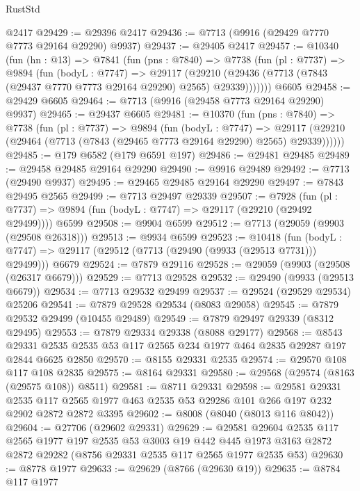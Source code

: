 \begin{lexlean}{RustStd}
\begin{coremodule}
    @2417
@29429 := @29396 @2417
@29436 := @7713 (@9916 (@29429 @7770 @7773 @29164 @29290) @9937)
@29437 := @29405 @2417
@29457 := @10340
    (fun (hn : @13) =>
    @7841
      (fun (pns : @7840) =>
      @7738
        (fun (pl : @7737) =>
        @9894
          (fun (bodyL : @7747) =>
          @29117
            (@29210 (@29436 (@7713 (@7843 (@29437 @7770 @7773 @29164 @29290) @2565) @29339)))))))
    @6605
@29458 := @29429 @6605
@29464 := @7713 (@9916 (@29458 @7773 @29164 @29290) @9937)
@29465 := @29437 @6605
@29481 := @10370
    (fun (pns : @7840) =>
    @7738
      (fun (pl : @7737) =>
      @9894
        (fun (bodyL : @7747) =>
        @29117 (@29210 (@29464 (@7713 (@7843 (@29465 @7773 @29164 @29290) @2565) @29339))))))
@29485 := @179 @6582 (@179 @6591 @197)
@29486 := @29481 @29485
@29489 := @29458 @29485 @29164 @29290
@29490 := @9916 @29489
@29492 := @7713 (@29490 @9937)
@29495 := @29465 @29485 @29164 @29290
@29497 := @7843 @29495 @2565
@29499 := @7713 @29497 @29339
@29507 := @7928
    (fun (pl : @7737) => @9894 (fun (bodyL : @7747) => @29117 (@29210 (@29492 @29499))))
    @6599
@29508 := @9904 @6599
@29512 := @7713 (@29059 (@9903 (@29508 @26318)))
@29513 := @9934 @6599
@29523 := @10418
    (fun (bodyL : @7747) => @29117 (@29512 (@7713 (@29490 (@9933 (@29513 @7731))) @29499)))
    @6679
@29524 := @7879 @29116
@29528 := @29059 (@9903 (@29508 (@26317 @6679)))
@29529 := @7713 @29528
@29532 := @29490 (@9933 (@29513 @6679))
@29534 := @7713 @29532 @29499
@29537 := @29524 (@29529 @29534) @25206
@29541 := @7879 @29528 @29534 (@8083 @29058)
@29545 := @7879 @29532 @29499 (@10455 @29489)
@29549 := @7879 @29497 @29339 (@8312 @29495)
@29553 := @7879 @29334 @29338 (@8088 @29177)
@29568 := @8543
    @29331
    @2535
    @2535
    @53
    @117
    @2565
    @234
    @1977
    @464
    @2835
    @29287
    @197
    @2844
    @6625
    @2850
@29570 := @8155 @29331 @2535
@29574 := @29570 @108 @117 @108 @2835
@29575 := @8164 @29331
@29580 := @29568 (@29574 (@8163 (@29575 @108)) @8511)
@29581 := @8711 @29331
@29598 := @29581
    @29331
    @2535
    @117
    @2565
    @1977
    @463
    @2535
    @53
    @29286
    @101
    @266
    @197
    @232
    @2902
    @2872
    @2872
    @3395
@29602 := @8008 (@8040 (@8013 @116 @8042))
@29604 := @27706 (@29602 @29331)
@29629 := @29581
    @29604
    @2535
    @117
    @2565
    @1977
    @197
    @2535
    @53
    @3003
    @19
    @442
    @445
    @1973
    @3163
    @2872
    @2872
    @29282
    (@8756 @29331 @2535 @117 @2565 @1977 @2535 @53)
@29630 := @8778 @1977
@29633 := @29629 (@8766 (@29630 @19))
@29635 := @8784 @117 @1977

\end{coremodule}
\end{lexlean}
